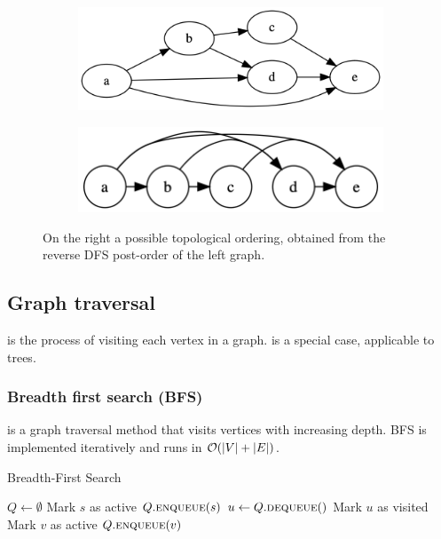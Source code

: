 \documentclass[a3paper, landscape, 11pt]{article} %
\begin{document}
\begin{multicols*}{4}
\begin{figure}[H]
  \begin{subfigure}[b]{0.45\columnwidth}
    \centering
    \includegraphics[width=1\textwidth]{images/dag-example-3.png}
    \label{fig:image4}
  \end{subfigure}
  \hfill
  \begin{subfigure}[b]{0.46\columnwidth}
    \centering
    \includegraphics[width=1\textwidth]{images/dag-ordered-round.png}
    \label{fig:image5}
  \end{subfigure}
  \caption*{On the right a possible topological ordering, obtained from the reverse DFS post-order  of the left graph. }
\end{figure}

\hrulefill %

\subsection*{Graph traversal}
 is the process of visiting each vertex in a graph.  is a special case, applicable to trees.

\subsubsection*{Breadth first search (BFS)}

 is a graph traversal method that visits vertices with increasing depth. BFS is implemented iteratively and runs in $\mathcal{O}(|V|+|E|)$.

\begin{algorithm}[H]
\caption{Breadth-First Search}
\begin{algorithmic}[1]
\State $Q \gets \emptyset$
\State Mark $s$ as active
\State $Q.\textsc{enqueue}(s)$
\State $u \gets Q.\textsc{dequeue}()$
\State Mark $u$ as visited
\State Mark $v$ as active
\State $Q.\textsc{enqueue}(v)$
\EndIf
\EndFor
\EndWhile
\EndProcedure
\end{algorithmic}
\end{algorithm}


\end{multicols*}
\end{document}
